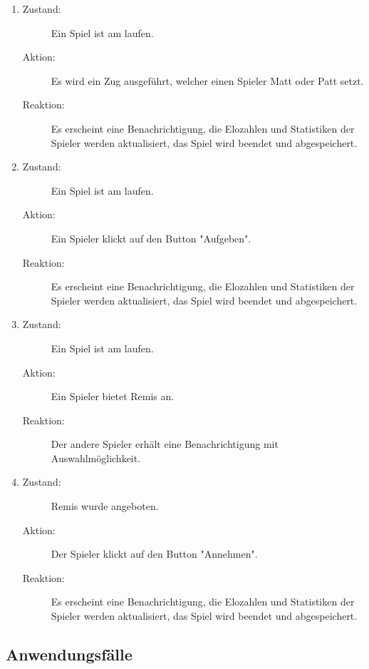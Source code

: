 \documentclass[parskip=full]{scrartcl}
\begin{document}
\begin{enumerate}
	\item
	\begin{description}
	\item[Zustand:] Ein Spiel ist am laufen.
	\item[Aktion:] Es wird ein Zug ausgeführt, welcher einen Spieler Matt oder Patt setzt.
	\item[Reaktion:] Es erscheint eine Benachrichtigung, die Elozahlen und Statistiken der Spieler werden aktualisiert, das Spiel wird beendet und abgespeichert.  \\
	\end{description}
	
	\item
	\begin{description}
	\item[Zustand:] Ein Spiel ist am laufen.
	\item[Aktion:] Ein Spieler klickt auf den Button "Aufgeben".
	\item[Reaktion:] Es erscheint eine Benachrichtigung, die Elozahlen und Statistiken der Spieler werden aktualisiert, das Spiel wird beendet und abgespeichert.  \\
	\end{description}
	
	\item
	\begin{description}
	\item[Zustand:] Ein Spiel ist am laufen.
	\item[Aktion:] Ein Spieler bietet Remis an.
	\item[Reaktion:] Der andere Spieler erhält eine Benachrichtigung mit Auswahlmöglichkeit.  \\
	\end{description}
	
	\item
	\begin{description}
	\item[Zustand:] Remis wurde angeboten.
	\item[Aktion:] Der Spieler klickt auf den Button "Annehmen".
	\item[Reaktion:] Es erscheint eine Benachrichtigung, die Elozahlen und Statistiken der Spieler werden aktualisiert, das Spiel wird beendet und abgespeichert.  \\
	\end{description}
	
	
	
	
\end{enumerate}
\subsection{Anwendungsfälle}
\end{document}
